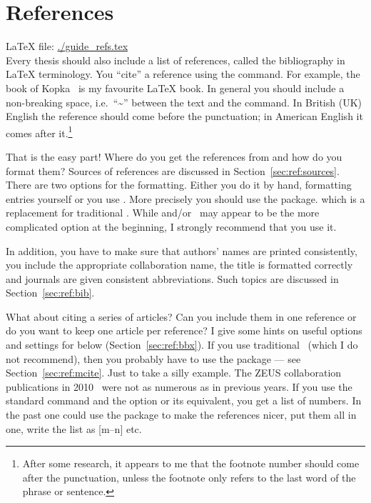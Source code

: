 
\chapter{References}
\label{sec:ref}

\LaTeX{} file: \url{./guide_refs.tex}\\[1ex]
\noindent
Every thesis should also include a list of references, called the
bibliography in \LaTeX{} terminology. You \enquote{cite} a reference using
the  command. For example, the book of
Kopka~\cite{kopka04} is my favourite \LaTeX{} book. In general you
should include a non-breaking space, i.e.\ \enquote{\textasciitilde} between
the text and the  command. In British (UK) English the reference
should come before the punctuation; in American English it comes after
it.\footnote{After some research, it appears to me that the footnote
  number should come after the punctuation, unless the footnote only
  refers to the last word of the phrase or sentence.}

That is the easy part!  Where do you get the references from and how
do you format them? Sources of references are discussed in
Section~\ref{sec:ref:sources}.
There are two options for the formatting. Either you do it by
hand, formatting  entries yourself or you use
\BibTeX. 
More precisely you should use the  package.
which is a replacement for traditional \BibTeX.
While  and/or \BibTeX\ may appear to be the more complicated option
at the beginning, I strongly recommend that you use it.

In addition, you have to make sure that authors' names are
printed consistently, you include the appropriate collaboration
name, the title is formatted correctly and journals are given
consistent abbreviations. Such topics are discussed in
Section~\ref{sec:ref:bib}.

What about citing a series of articles? Can you
include them in one reference or do you want to keep one article per
reference?
I give some hints on
useful options and settings for  below (Section~\ref{sec:ref:bbx}).
If you use traditional \BibTeX\ (which I do not recommend), then you probably have to use the 
package --- see Section~\ref{sec:ref:mcite}.
Just to take a silly example. The ZEUS collaboration
publications in
2010~\cite{Abramowicz:2010ih,Abramowicz:2010xc,Abramowicz:2010nj} were
not as numerous as in previous years. If you use the standard
 command and the  option or its equivalent,
you get a list of numbers.  In the past one could use the
 package to make the references nicer, put them all in
one, write the list as [m--n] etc.


